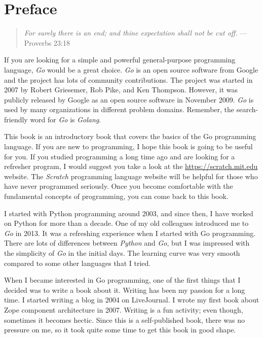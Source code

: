 \cleardoublepage
{}
\chapter*{Preface}

\begin{quote}
\textit{For surely there is an end; and thine expectation shall not be cut
off.} --- Proverbs 23:18
\end{quote}

If you are looking for a simple and powerful general-purpose
programming language, \textit{Go} would be a great
choice.  \textit{Go} is an open source software from Google and the
project has lots of community contributions.  The project was started
in 2007 by Robert Griesemer, Rob Pike, and Ken Thompson.  However, it
was publicly released by Google as an open source software in November
2009.  \textit{Go} is used by many organizations in different problem
domains.  Remember, the search-friendly word for \textit{Go}
is \textit{Golang}.

This book is an introductory book that covers the basics of the Go
programming language.  If you are new to programming, I hope this book
is going to be useful for you.  If you studied programming a long time
ago and are looking for a refresher program, I would suggest you take
a look at the \url{https://scratch.mit.edu} website.
The \textit{Scratch} programming language website will be helpful for
those who have never programmed seriously.  Once you become
comfortable with the fundamental concepts of programming, you can come
back to this book.

I started with Python programming around 2003, and since then, I have
worked on Python for more than a decade.  One of my old colleagues
introduced me to \textit{Go} in 2013.  It was a refreshing experience
when I started with Go programming.  There are lots of differences
between \textit{Python} and \textit{Go}, but I was impressed with the
simplicity of \textit{Go} in the initial days.  The learning curve was
very smooth compared to some other languages that I tried.

When I became interested in Go programming, one of the first things
that I decided was to write a book about it.  Writing has been my
passion for a long time.  I started writing a blog in 2004 on
LiveJournal.  I wrote my first book about Zope component architecture
in 2007.  Writing is a fun activity; even though, sometimes it becomes
hectic.  Since this is a self-published book, there was no pressure on
me, so it took quite some time to get this book in good shape.

